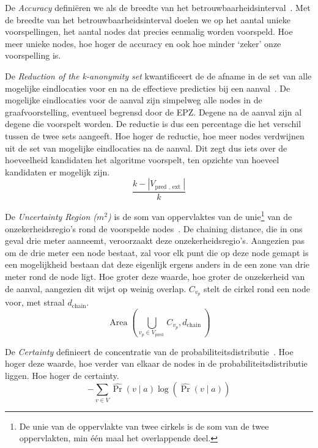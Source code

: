 De \textit{Accuracy} definiëren we als de breedte van het
betrouwbaarheidsinterval~\cite{Dhondt, Verdonck_2022}. Met de breedte van het
betrouwbaarheidsinterval doelen we op het aantal unieke voorspellingen, het
aantal nodes dat precies eenmalig worden voorspeld. Hoe meer unieke nodes, hoe
hoger de accuracy en ook hoe minder `zeker' onze voorspelling is.

De \textit{Reduction of the k-anonymity set} kwantificeert de de afname in de
set van alle mogelijke eindlocaties voor en na de effectieve predicties bij een
aanval~\cite{Dhondt, Verdonck_2022}. De mogelijke eindlocaties voor de aanval
zijn simpelweg alle nodes in de graafvoorstelling, eventueel begrensd door de
\ac{EPZ}. Degene na de aanval zijn al degene die voorspelt worden. De reductie
is dus een percentage die het verschil tussen de twee sets aangeeft. Hoe hoger
de reductie, hoe meer nodes verdwijnen uit de set van mogelijke eindlocaties na
de aanval. Dit zegt dus iets over de hoeveelheid kandidaten het algoritme
voorspelt, ten opzichte van hoeveel kandidaten er mogelijk zijn.
\begin{equation}
    \frac{k-\left|V_{\text {pred }, \text { ext }}\right|}{k}\label{eq:reduction}
\end{equation}

De \textit{Uncertainty Region ($m^2$)} is de som van oppervlaktes van de
unie\footnote{De unie van de oppervlakte van twee cirkels is de som van de twee
    oppervlakten, min één maal het overlappende deel.} van de onzekerheidsregio's
rond de voorspelde nodes~\cite{Dhondt,Verdonck_2022}. De chaining distance, die
in ons geval drie meter aanneemt, veroorzaakt deze onzekerheidsregio's.
Aangezien pas om de drie meter een node bestaat, zal voor elk punt die op deze
node gemapt is een mogelijkheid bestaan dat deze eigenlijk ergens anders in de
een zone van drie meter rond de node ligt. Hoe groter deze waarde, hoe groter
de onzekerheid van de aanval, aangezien dit wijst op weinig overlap. $C_{v_p}$
stelt de cirkel rond een node voor, met straal $d_{\text{chain}}$.
\begin{equation}
    \operatorname{Area}\left(\bigcup_{v_p \in V_{\text {pred }}} C_{v_p}, d_{\text {chain }}\right)\label{eq:uncertainty}
\end{equation}

De \textit{Certainty} definieert de concentratie van de
probabiliteitsdistributie~\cite{Dhondt}. Hoe hoger deze waarde, hoe verder van
elkaar de nodes in de probabiliteitsdistributie liggen. Hoe hoger de certainty.
\begin{equation}
    -\sum_{v \in V} \widehat{\operatorname{Pr}}(v \mid a) \log (\widehat{\operatorname{Pr}}(v \mid a))\label{eq:certainty}
\end{equation}

